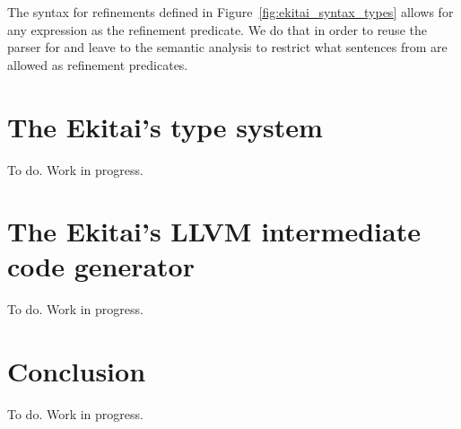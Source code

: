 \documentclass[
  oneside,
  english,
  coorientadorbanca,
  noabntexcite
]{ufsc-thesis-rn46-2019}
\newcommand{\codett}[1]{\text{\scpfamily#1}}
\newcommand{\bnfvar}[1]{\codett{#1}}
\begin{document}
The syntax for refinements defined in Figure~\ref{fig:ekitai_syntax_types} allows for any expression as the refinement predicate.
We do that in order to reuse the parser for \bnfvar{Expr} and leave to the semantic analysis to restrict what sentences from \bnfvar{Expr} are allowed as refinement predicates.

\section{The Ekitai's type system}

To do. Work in progress.

\section{The Ekitai's LLVM intermediate code generator}

To do. Work in progress.

\section{Conclusion}

To do. Work in progress.


\postextual{}

\printbibliography{}
\end{document}
